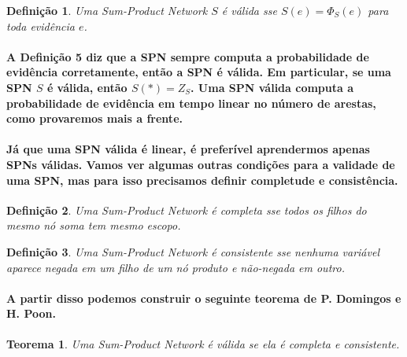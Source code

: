 \documentclass[a4paper,10pt]{article}
\theoremstyle{plain}
\newtheorem{spn-def}{Definição}
\newtheorem{spn-thm}{Teorema}
\begin{document}
\begin{spn-def} Uma Sum-Product Network $S$ é válida sse $S(e)=\Phi_S(e)$ para toda evidência $e$.
\end{spn-def}

\paragraph{
  A Definição 5 diz que a SPN sempre computa a probabilidade de evidência corretamente, então a SPN
  é válida. Em particular, se uma SPN $S$ é válida, então $S(*)=Z_S$. Uma SPN válida computa a
  probabilidade de evidência em tempo linear no número de arestas, como provaremos mais a frente.
}

\paragraph{
  Já que uma SPN válida é linear, é preferível aprendermos apenas SPNs válidas. Vamos ver algumas
  outras condições para a validade de uma SPN, mas para isso precisamos definir completude e
  consistência.
}

\begin{spn-def} Uma Sum-Product Network é \emph{completa} sse todos os filhos do mesmo nó soma tem
  mesmo escopo.
\end{spn-def}

\begin{spn-def} Uma Sum-Product Network é \emph{consistente} sse nenhuma variável aparece negada em
  um filho de um nó produto e não-negada em outro.
\end{spn-def}

\paragraph{
  A partir disso podemos construir o seguinte teorema de P. Domingos e H. Poon\cite{poon-domingos}.
}

\begin{spn-thm} Uma Sum-Product Network é válida se ela é completa e consistente.
\end{spn-thm}
\end{document}
